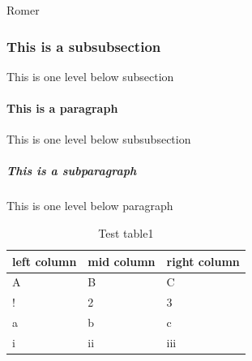Romer \parencite{romer1990endogenous}

\subsubsection{This is a subsubsection}
This is one level below subsection

\paragraph{This is a paragraph}
This is one level below subsubsection


\subparagraph{This is a subparagraph}
This is one level below paragraph

\begin{center}
\begin{table}[h]%
\centering
\begin{tabular}{lll}%
	\hline %
	\textbf{left column} & \textbf{mid column} & \textbf{right column} \\
	\hline
	A & B & C \\
	! & 2 & 3 \\
	a & b & c \\
	i & ii & iii \\
	\hline
\end{tabular}
\caption{Test table1}
\label{tab:threecols1}
\end{table}
\end{center}
    


